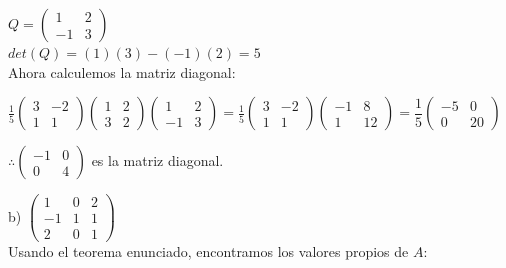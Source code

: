 \documentclass[letterpaper]{article}
\renewcommand{\*}{\cdot}
\theoremstyle{definition}
\begin{document}
	$Q = \begin{pmatrix} 1 & 2 \\ -1 & 3 \end{pmatrix}$ \\        $det(Q) =(1)(3)-(-1)(2)= 5$\\
	Ahora calculemos la matriz diagonal:\\
	\begin{center}
	$\frac{1}{5}\begin{pmatrix}	3 & -2 \\ 1 & 1 \end{pmatrix} \begin{pmatrix}	1 & 2 \\ 3 & 2 \end{pmatrix} \begin{pmatrix} 	1 & 2 \\ -1 & 3	\end{pmatrix} = \frac{1}{5} \begin{pmatrix}
	3 & -2 \\ 1 & 1 \end{pmatrix} \begin{pmatrix}
	-1 & 8 \\ 1 & 12 \end{pmatrix}= \dfrac{1}{5}\begin{pmatrix} -5 & 0 \\ 0 & 20\end{pmatrix}$  
	\end{center}
	\begin{center}
	$\therefore \begin{pmatrix} -1 & 0 \\ 0 & 4 	\end{pmatrix}$ es la matriz diagonal.
	\end{center}
	b) $\begin{pmatrix} 1 & 0 & 2 \\ -1 & 1 & 1 \\ 2 & 0 & 1 \end{pmatrix}$\\
	Usando el teorema enunciado, encontramos los valores propios de $A$:\\
\end{document}
